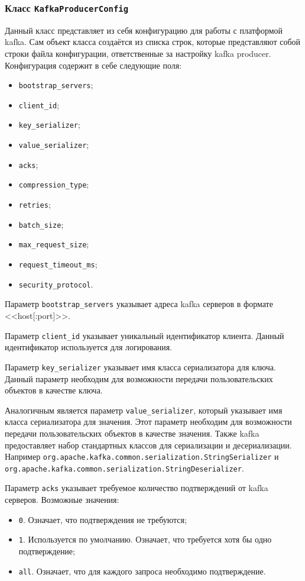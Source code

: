 \subsubsection{Класс \texttt{KafkaProducerConfig}}

Данный класс представляет из себя конфигурацию для работы с платформой kafka.
Сам объект класса создаётся из списка строк, которые представляют собой строки файла конфигурации, ответственные за настройку kafka producer.
Конфигурация содержит в себе следующие поля:
\begin{itemize}
    \item \texttt{bootstrap\_servers};
    \item \texttt{client\_id};
    \item \texttt{key\_serializer};
    \item \texttt{value\_serializer};
    \item \texttt{acks};
    \item \texttt{compression\_type};
    \item \texttt{retries};
    \item \texttt{batch\_size};
    \item \texttt{max\_request\_size};
    \item \texttt{request\_timeout\_ms};
    \item \texttt{security\_protocol}.
\end{itemize}

Параметр \texttt{bootstrap\_servers} указывает адреса kafka серверов в формате <<host[:port]>>.

Параметр \texttt{client\_id} указывает уникальный идентификатор клиента.
Данный идентификатор используется для логирования.

Параметр \texttt{key\_serializer} указывает имя класса сериализатора для ключа.
Данный параметр необходим для возможности передачи пользовательских объектов в качестве ключа.

Аналогичным является параметр \texttt{value\_serializer}, который указывает имя класса сериализатора для значения.
Этот параметр необходим для возможности передачи пользовательских объектов в качестве значения.
Также kafka предоставляет набор стандартных классов для сериализации и десериализации.
Например \texttt{org.apache.kafka.common.serialization.StringSerializer} и \texttt{org.apache.kafka.common.serialization.StringDeserializer}.

Параметр \texttt{acks} указывает требуемое количество подтверждений от kafka серверов.
Возможные значения:
\begin{itemize}
    \item \texttt{0}. Означает, что подтверждения не требуются;
    \item \texttt{1}. Используется по умолчанию. Означает, что требуется хотя бы одно подтверждение;
    \item \texttt{all}. Означает, что для каждого запроса необходимо подтверждение.
\end{itemize}

